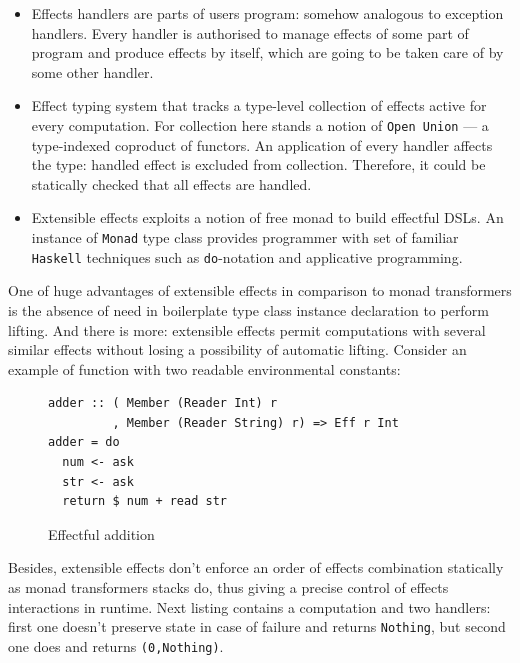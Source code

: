    \begin{itemize}
    \item Effects handlers are parts of users program: somehow analogous to exception handlers.
    Every handler is authorised to manage effects of some part of program and produce effects by
    itself, which are going to be taken care of by some other handler.

    \item Effect typing system that tracks a type-level collection of effects active for every
    computation. For collection here stands a notion of \texttt{Open Union} --- a type-indexed
    coproduct of functors. An application of every handler affects the type:
    handled effect is excluded from collection. Therefore, it could be statically
    checked that all effects are handled.

    \item Extensible effects exploits a notion of free monad to build effectful DSLs. An
    instance of \texttt{Monad} type class provides programmer with set of familiar
    \texttt{Haskell} techniques such as \texttt{do}-notation and applicative programming.
    \end{itemize}

    One of huge advantages of extensible effects in comparison to monad transformers is the
    absence of need in boilerplate type class instance declaration to perform lifting. And
    there is more: extensible effects permit computations with several similar effects without
    losing a possibility of automatic lifting. Consider an example of function with two readable
    environmental constants:

    \begin{figure}[h]
    \begin{lstlisting}
adder :: ( Member (Reader Int) r
         , Member (Reader String) r) => Eff r Int
adder = do
  num <- ask
  str <- ask
  return $ num + read str
    \end{lstlisting}
    \caption{Effectful addition}
    \label{listing:ExtEffAdder}
    \end{figure}

    Besides, extensible effects don't enforce an order of effects combination statically as monad
    transformers stacks do, thus giving a precise control of effects interactions in runtime.
    Next listing contains a computation and two handlers: first one doesn't preserve state in
    case of failure and returns \texttt{Nothing}, but second one does and returns
    \texttt{(0,Nothing)}.


